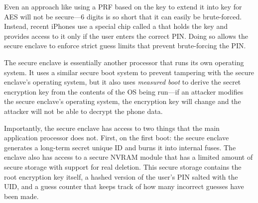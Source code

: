 Even an approach like using a PRF based on the key to extend it into key for AES will not be secure---6 digits is so short that it can easily be brute-forced. Instead, recent iPhones use a special chip called a  that holds the key and provides access to it only if the user enters the correct PIN. Doing so allows the secure enclave to enforce strict guess limits that prevent brute-forcing the PIN.

The secure enclave is essentially another processor that runs its own operating system. It uses a similar secure boot system to prevent tampering with the secure enclave's operating system, but it also uses \emph{measured boot} to derive the secret encryption key from the contents of the OS being run---if an attacker modifies the secure enclave's operating system, the encryption key will change and the attacker will not be able to decrypt the phone data.

Importantly, the secure enclave has access to two things that the main application processor does not. First, on the first boot: the secure enclave generates a long-term secret unique ID and burns it into internal fuses. The enclave also has access to a secure NVRAM module that has a limited amount of secure storage with support for real deletion. This secure storage contains the root encryption key itself, a hashed version of the user's PIN salted with the UID, and a guess counter that keeps track of how many incorrect guesses have been made.

